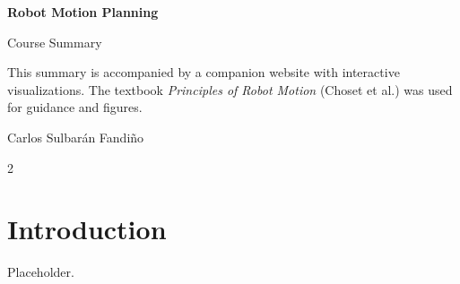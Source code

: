 \documentclass[10pt,a4paper]{article}
\begin{document}
\begin{center}
{\huge\bfseries Robot Motion Planning}

{\Large Course Summary}

{\small This summary is accompanied by a companion website with interactive visualizations. The textbook \emph{Principles of Robot Motion} (Choset et al.) was used for guidance and figures.}

{\small Carlos Sulbarán Fandiño}
\end{center}
\vspace{6pt}

\raggedcolumns
\begin{multicols}{2}


\section{Introduction}
Placeholder.

\end{multicols}
\end{document}
